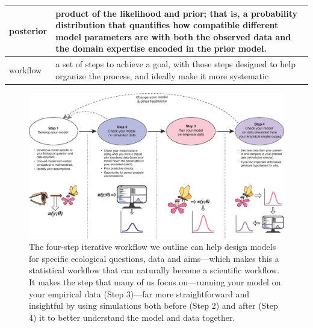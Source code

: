 \documentclass[11pt]{article}
\begin{document}
\begin{table}
\begin{tabular}{ p{3 cm}  p{13 cm} }
posterior & product of the likelihood and prior; that is, a probability distribution that quantifies how compatible different model parameters are with both the observed data and the domain expertise encoded in the prior model. \\\hline
workflow & a set of steps to achieve a goal, with those steps designed to help organize the process, and ideally make it more systematic  \\\hline
\hline
\end{tabular}
\label{tab:glossary}
\end{table}


\newpage

\begin{figure}[ht]
\centering
\noindent \includegraphics[width=1\textwidth]{workflow.eps}
\caption{The four-step iterative workflow we outline can help design models for specific ecological questions, data and aims---which makes this a statistical workflow that can naturally become a scientific workflow. It makes the step that many of us focus on---running your model on your empirical data (Step 3)---far more straightforward and insightful by using simulations both before (Step 2) and after (Step 4) it to better understand the model and data together.}
\label{fig:workflow}
\end{figure}
\end{document}

